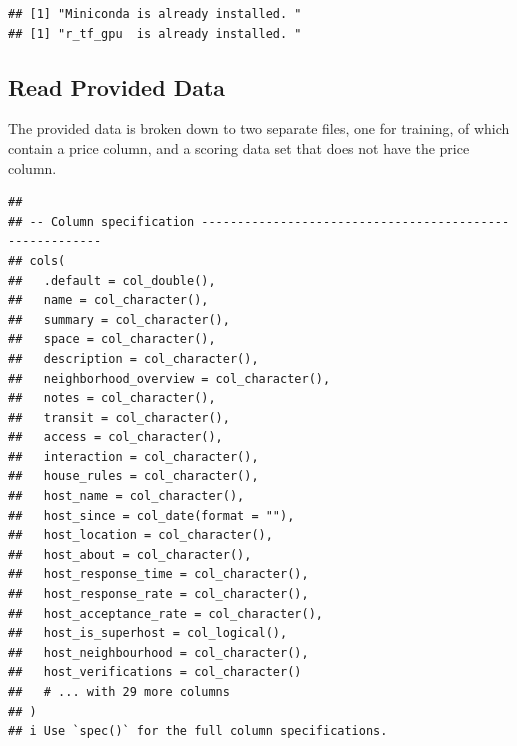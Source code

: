 \documentclass[
]{article}
\newenvironment{Shaded}{\begin{snugshade}}{\end{snugshade}}
\newcommand{\AttributeTok}[1]{\textcolor[rgb]{0.77,0.63,0.00}{#1}}
\newcommand{\ControlFlowTok}[1]{\textcolor[rgb]{0.13,0.29,0.53}{\textbf{#1}}}
\newcommand{\FunctionTok}[1]{\textcolor[rgb]{0.00,0.00,0.00}{#1}}
\newcommand{\NormalTok}[1]{#1}
\newcommand{\OtherTok}[1]{\textcolor[rgb]{0.56,0.35,0.01}{#1}}
\newcommand{\SpecialCharTok}[1]{\textcolor[rgb]{0.00,0.00,0.00}{#1}}
\newcommand{\StringTok}[1]{\textcolor[rgb]{0.31,0.60,0.02}{#1}}
\begin{document}
\begin{verbatim}
## [1] "Miniconda is already installed. "
## [1] "r_tf_gpu  is already installed. "
\end{verbatim}

\hypertarget{read-provided-data}{%
\subsection{Read Provided Data}\label{read-provided-data}}

The provided data is broken down to two separate files, one for
training, of which contain a price column, and a scoring data set that
does not have the price column.

\begin{Shaded}
\end{Shaded}

\begin{verbatim}
## 
## -- Column specification --------------------------------------------------------
## cols(
##   .default = col_double(),
##   name = col_character(),
##   summary = col_character(),
##   space = col_character(),
##   description = col_character(),
##   neighborhood_overview = col_character(),
##   notes = col_character(),
##   transit = col_character(),
##   access = col_character(),
##   interaction = col_character(),
##   house_rules = col_character(),
##   host_name = col_character(),
##   host_since = col_date(format = ""),
##   host_location = col_character(),
##   host_about = col_character(),
##   host_response_time = col_character(),
##   host_response_rate = col_character(),
##   host_acceptance_rate = col_character(),
##   host_is_superhost = col_logical(),
##   host_neighbourhood = col_character(),
##   host_verifications = col_character()
##   # ... with 29 more columns
## )
## i Use `spec()` for the full column specifications.
\end{verbatim}
\end{document}
